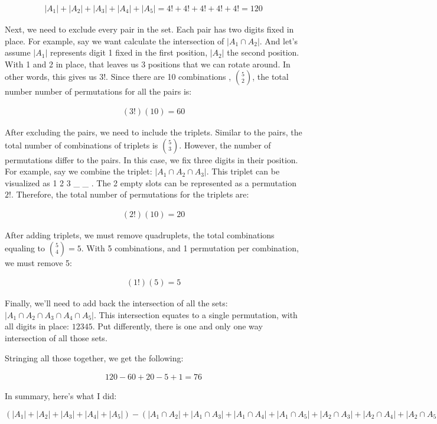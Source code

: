 \documentclass{article}
\begin{document}
\begin{align*}
|A_1| + |A_2| + |A_3| + |A_4| + |A_5| = 4! + 4! + 4! + 4! + 4! = 120
\end{align*}

Next, we need to exclude every pair in the set. Each pair has two digits fixed in place. For example, say we want calculate the intersection of $|A_1 \cap A_2|$. And let's assume $|A_1|$ represents digit 1 fixed in the first position, $|A_2|$ the second position. With 1 and 2 in place, that leaves us 3 positions that we can rotate around. In other words, this gives us $3!$. Since there are 10 combinations , $\binom{5}{2}$, the total number number of permutations for all the pairs is: 

\begin{align*}
(3!)(10) = 60
\end{align*}


After excluding the pairs, we need to include the triplets. Similar to the pairs, the total number of combinations of triplets is $\binom{5}{3}$. However, the number of permutations differ to the pairs. In this case, we fix three digits in their position. For example, say we combine the triplet: $|A_1 \cap A_2 \cap A_3|$. This triplet can be visualized as 1 2 3 \_ \_ . The 2 empty slots can be represented as a permutation $2!$. Therefore, the total number of permutations for the triplets are:

\begin{align*}
(2!)(10) = 20
\end{align*}

After adding triplets, we must remove quadruplets, the total combinations equaling to $\binom{5}{4} = 5$. With 5 combinations, and 1 permutation per combination, we must remove 5:

\begin{align*}
(1!)(5) = 5
\end{align*}

Finally, we'll need to add back the intersection of all the sets: $|A_1 \cap A_2 \cap A_3 \cap A_4 \cap A_5|$. This intersection equates to a single permutation, with all digits in place: $1 2 3 4 5$. Put differently, there is one and only one way intersection of all those sets.

Stringing all those together, we get the following:

\begin{align*}
120 - 60 + 20 - 5 + 1 = 76
\end{align*}

In summary, here's what I did:

$(|A_1| + |A_2| + |A_3| + |A_4| + |A_5|) - (|A_1\cap A_2| + |A_1 \cap A_3| + |A_1 \cap A_4| + |A_1 \cap A_5| + |A_2 \cap A_3| + |A_2 \cap A_4| + |A_2 \cap A_5| + |A_3 \cap A_4| + |A_3 \cap A_5| + |A_4 \cap A_5|) + (|A_1 \cap A_2 \cap A_3| + |A_1 \cap A_2 \cap A_4| + |A_1 \cap A_2 \cap A_5| + |A_1 \cap A_3 \cap A_4| + |A_1 \cap A_3 \cap A_5| + |A_2 \cap A_3 \cap A_4| + |A_2 \cap A_3 \cap A_5| + |A_3 \cap A_4 \cap A_5|) - (|A_1 \cap A_2 \cap A_3 \cap A_4 \cap A_5|)$
\end{document}
